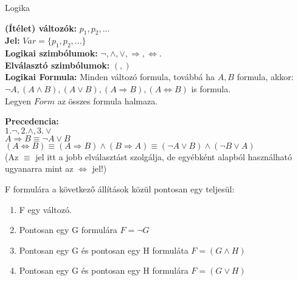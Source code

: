 
\begin{frame}[plain]
\begin{tcolorbox}[center, colback={myyellow}, coltext={black}, colframe={myyellow}]
    {\Huge Logika}
    \mmedskip
\end{tcolorbox}
\end{frame}

\begin{frame}

\begin{tcolorbox}[squeezed title={(Ítélet) változók, Logikai szimbólumok, Elválasztó szimbólumok, Logikai formula}]
\mbigskip
\textbf{(Ítélet) változók:} $p_1, p_2, ...$\\
\hspace{1ex} \textbf{Jel: } $Var = \{p_1, p_2, ...\}$\\
\mbigskip
\textbf{Logikai szimbólumok:} ${\neg}, {\land}, {\lor}, {\Rightarrow}, {\iff}.$\\
\mbigskip
\textbf{Elválasztó szimbólumok:} $(, )$\\
\mbigskip
\textbf{Logikai Formula:} Minden változó formula, továbbá ha $A, B$ formula, akkor:\\
\textbf{${\neg}A, (A \land B), (A \lor B), (A \Rightarrow B), (A \iff B)$} is formula.\\
\mbigskip
Legyen $Form$ az összes formula halmaza.
\end{tcolorbox}

\begin{tcolorbox}[title={Megj}]
\textbf{Precedencia:}\\ 
\mbigskip
$1. {\neg}, 2. {\land}, 3. {\lor}$\\
\mbigskip
$A \Rightarrow B \equiv {\neg}A \lor B$\\
$(A \iff B) \equiv (A \Rightarrow B) \land (B \Rightarrow A) \equiv ({\neg}A \lor B) \land ({\neg}B \lor A)$\\
\mbigskip
(Az $\equiv$ jel itt a jobb elválasztást szolgálja, de egyébként alapból használható ugyanarra mint az $\iff$ jel!)
\end{tcolorbox}
\end{frame}

\begin{frame}
\begin{tcolorbox}[title={Tétel: Minden formula egyértelműen olvasható}]
F formulára a következő állítások közül pontosan egy teljesül:
\begin{enumerate}
\item F egy változó.
\item Pontosan egy G formulára $F = \neg G$
\item Pontosan egy G és pontosan egy H formuláta $F = (G \land H)$
\item Pontosan egy G és pontosan egy H formulára $F = (G \lor H)$
\end{enumerate}
\end{tcolorbox}
\end{frame}

